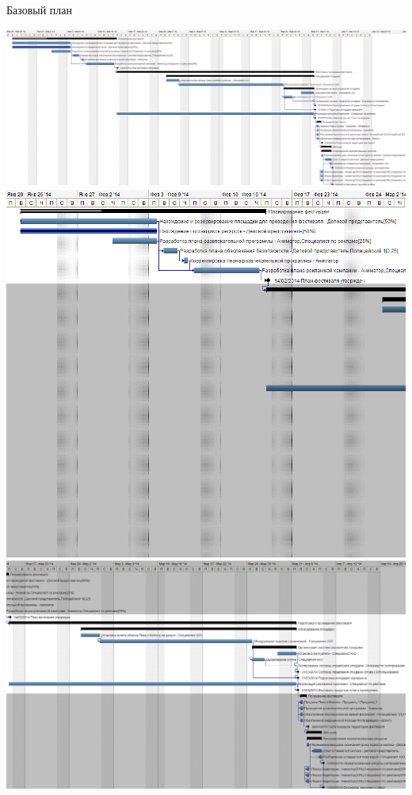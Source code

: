\documentclass[10pt,pdf,hyperref=unicode,hyperref={bookmarks=false}]{beamer}
\begin{document}
    \begin{frame}[allowframebreaks]{Базовый план}
      \begin{center}
        \includegraphics[keepaspectratio=true,width=\textwidth,height=0.8\textheight]{gant_over.png}\\
        \framebreak
        \includegraphics[keepaspectratio=true,width=\textwidth,height=0.8\textheight]{gant11.png}\\
        \framebreak
        \includegraphics[keepaspectratio=true,width=\textwidth,height=0.8\textheight]{gant22.png}\\

\end{center}
\end{frame}
\end{document}
